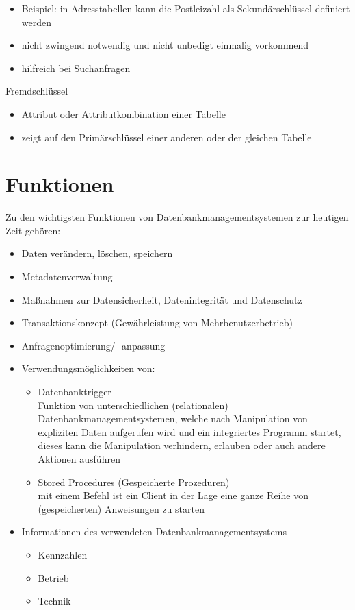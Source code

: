 \documentclass[12pt,a4paper]{report}
\begin{document}
\begin{onehalfspace}
\begin{itemize}
\item Beispiel: in Adresstabellen kann die Postleizahl als Sekundärschlüssel definiert werden
\item nicht zwingend notwendig und nicht unbedigt einmalig vorkommend
\item hilfreich bei Suchanfragen
\end{itemize}
Fremdschlüssel
\begin{itemize}
\item Attribut oder Attributkombination einer Tabelle
\item zeigt auf den Primärschlüssel einer anderen oder der gleichen Tabelle
\end{itemize}

\section{Funktionen}
Zu den wichtigsten Funktionen von Datenbankmanagementsystemen zur heutigen Zeit gehören:
\begin{itemize}
\item Daten verändern, löschen, speichern
\item Metadatenverwaltung
\item Maßnahmen zur Datensicherheit, Datenintegrität und Datenschutz
\item Transaktionskonzept (Gewährleistung von Mehrbenutzerbetrieb)
\item Anfragenoptimierung/- anpassung
\item Verwendungsmöglichkeiten von: 
\begin{itemize}
\item Datenbanktrigger\\
Funktion von unterschiedlichen (relationalen) Datenbankmanagementsystemen, welche nach Manipulation von expliziten Daten aufgerufen wird und ein integriertes Programm startet, dieses kann die Manipulation verhindern, erlauben oder auch andere Aktionen ausführen
\item Stored Procedures (Gespeicherte Prozeduren)\\
mit einem Befehl ist ein Client in der Lage eine ganze Reihe von (gespeicherten) Anweisungen zu starten
\end{itemize}
\item Informationen des verwendeten Datenbankmanagementsystems
\begin{itemize}
\item Kennzahlen
\item Betrieb
\item Technik
\end{itemize}
\end{itemize}


\end{onehalfspace}
\end{document}
